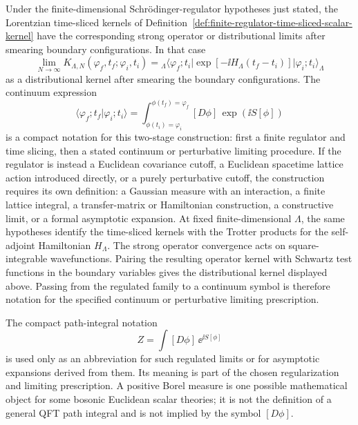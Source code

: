 Under the finite-dimensional Schr\"odinger-regulator hypotheses just stated,
the Lorentzian
time-sliced kernels of
Definition~\ref{def:finite-regulator-time-sliced-scalar-kernel} have the
corresponding strong operator or distributional limits after smearing boundary
configurations.  In that case
\[
  \lim_{N\to\infty}
  K_{\Lambda,N}(\varphi_f,t_f;\varphi_i,t_i)
  =
  {}_\Lambda\langle\varphi_f;t_i|
  \exp[-\ii H_\Lambda(t_f-t_i)]
  |\varphi_i;t_i\rangle_\Lambda
\]
as a distributional kernel after smearing the boundary configurations.  The
continuum expression
\[
  \langle\varphi_f;t_f|\varphi_i;t_i\rangle
  =
  \int_{\phi(t_i)=\varphi_i}^{\phi(t_f)=\varphi_f}
  [D\phi]\,
  \exp\left(\ii S[\phi]\right)
\]
is a compact notation for this two-stage construction: first a finite regulator
and time slicing, then a stated continuum or perturbative limiting procedure.
If the regulator is instead a Euclidean covariance cutoff, a Euclidean
spacetime lattice action introduced directly, or a purely perturbative cutoff,
the construction requires its own definition: a Gaussian measure with an
interaction, a finite lattice integral, a transfer-matrix or Hamiltonian
construction, a constructive limit, or a formal asymptotic expansion.
At fixed finite-dimensional \(\Lambda\), the same hypotheses identify the
time-sliced kernels with the Trotter products for the self-adjoint Hamiltonian
\(H_\Lambda\).  The strong operator convergence acts on square-integrable
wavefunctions.  Pairing the resulting operator kernel with Schwartz test
functions in the boundary variables gives the distributional kernel displayed
above.  Passing from the regulated family to a continuum symbol is therefore
notation for the specified continuum or perturbative limiting prescription.

\begin{definition}
\label{def:compact-scalar-path-integral-notation}
The compact path-integral notation
\[
  Z=\int [D\phi]\,\ee^{\ii S[\phi]}
\]
is used only as an abbreviation for such regulated limits or for asymptotic
expansions derived from them. Its meaning is part of the chosen regularization
and limiting prescription.  A positive Borel measure is one possible
mathematical object for some bosonic Euclidean scalar theories; it is not the
definition of a general QFT path integral and is not implied by the symbol
\([D\phi]\).
\end{definition}

